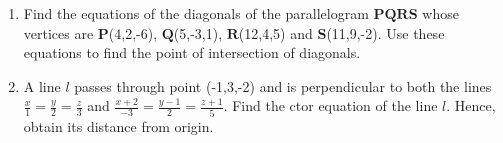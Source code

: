 \documentclass{article}
\let\vec\mathbf
\begin{document}
\begin{enumerate}
		\item Find the equations of the diagonals of the parallelogram $\vec{PQRS}$ whose vertices are $\vec{P}$(4,2,-6), $\vec{Q}$(5,-3,1), $\vec{R}$(12,4,5) and $\vec{S}$(11,9,-2). Use these equations to find the point of intersection of diagonals.

	\item A line $l$ passes through point (-1,3,-2) and is perpendicular to both the lines $\frac {x}{1}=\frac{y}{2}=\frac{z}{3}$ and $\frac {x+2}{-3}=\frac{y-1}{2}=\frac{z+1}{5}$. Find the ctor equation of the line $l$. Hence, obtain its distance from origin.

\end{enumerate}
\end{document}
